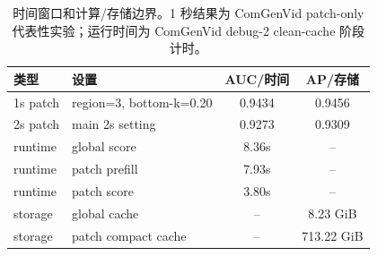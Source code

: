 \begin{table}[!t]
  \centering
  \caption{时间窗口和计算/存储边界。1 秒结果为 ComGenVid patch-only 代表性实验；运行时间为 ComGenVid debug-2 clean-cache 阶段计时。}
  \label{tab:runtime_window_boundary}
  \begin{tabular}{llcc}
    \toprule
    类型 & 设置 & AUC/时间 & AP/存储 \\
    \midrule
    1s patch & region=3, bottom-k=0.20 & 0.9434 & 0.9456 \\
    2s patch & main 2s setting & 0.9273 & 0.9309 \\
    \midrule
    runtime & global score & 8.36s & -- \\
    runtime & patch prefill & 7.93s & -- \\
    runtime & patch score & 3.80s & -- \\
    \midrule
    storage & global cache & -- & 8.23 GiB \\
    storage & patch compact cache & -- & 713.22 GiB \\
    \bottomrule
  \end{tabular}
\end{table}
